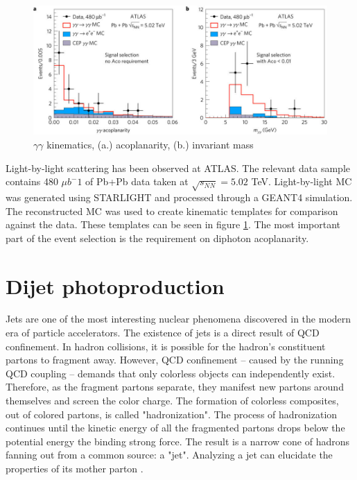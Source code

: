 \begin{figure}[]
\begin{centering}
\includegraphics[width=7in]{Chapter2/importfigs/nphys4208-f3.jpg}
\par\end{centering}
\caption{$\gamma \gamma$ kinematics, (a.) acoplanarity, (b.) invariant mass \cite{Aaboud:2017bwk} \label{fig:ggKin}}
\end{figure}

Light-by-light scattering has been observed at ATLAS. The relevant data sample contains 480 $\mu b^-1$ of Pb+Pb data taken at $\sqrt{s_{NN}}=5.02$ TeV. Light-by-light MC was generated using STARLIGHT and processed through a GEANT4 simulation. The reconstructed MC was used to create kinematic templates for comparison against the data. These templates can be seen in figure \ref{fig:ggKin}. The most important part of the event selection is the requirement on diphoton acoplanarity. 

\section{Dijet photoproduction}

Jets are one of the most interesting nuclear phenomena discovered in the modern era of particle accelerators. The existence of jets is a direct result of QCD confinement. In hadron collisions, it is possible for the hadron's constituent partons to fragment away. However, QCD confinement -- caused by the running QCD coupling -- demands that only colorless objects can independently exist. Therefore, as the fragment partons separate, they manifest new partons around themselves and screen the color charge. The formation of colorless composites, out of colored partons, is called "hadronization". The process of hadronization continues until the kinetic energy of all the fragmented partons drops below the potential energy the binding strong force. The result is a narrow cone of hadrons fanning out from a common source: a "jet". Analyzing a jet can elucidate the properties of its mother parton \cite{d'Enterria:2004nv}.  

